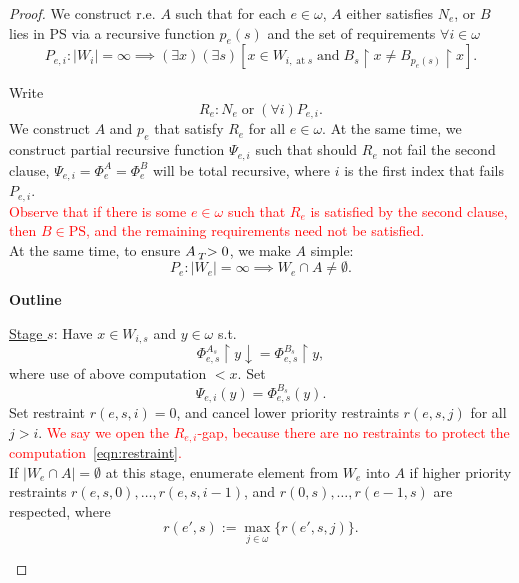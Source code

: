\documentclass{article}
\newcommand{\COMMENT}[1]{\textcolor{red}{#1}}
\begin{document}
  \begin{proof}
    We construct r.e. $A$ such that for each $e\in\omega$, $A$
    either satisfies $N_e$, or $B$ lies in PS via a recursive function
    $p_e(s)$ and the set of requirements $\forall i\in\omega$
    \[P_{e,i}: |W_i|=\infty \implies (\exists x)(\exists s) [x\in
    W_{i,\; \text{at}\; s}\; \text{and}\; B_s\restriction x \neq B_{p_e(s)}
    \restriction x].\]

    Write
    \[R_e: N_e\; \text{or}\; (\forall i)P_{e,i}.\]
    We construct $A$ and $p_e$ that satisfy $R_e$ for all $e\in\omega$. At
    the same time, we construct partial recursive function $\Psi_{e,i}$
    such that should $R_e$ not fail the second clause,
    $\Psi_{e,i}=\Phi_e^A=\Phi_e^B$ will be total recursive, where $i$ is
    the first index that fails $P_{e,i}$.\\

    \COMMENT{Observe that if there is some $e\in\omega$ such that $R_e$ is
    satisfied by the second clause, then $B\in\text{PS}$, and the remaining
    requirements need not be satisfied.}\\

    At the same time, to ensure $A\prescript{}{T}{>}\;0$, we make $A$
    simple:
    \[P_e: |W_e|=\infty \implies W_e\cap A\neq\emptyset.\]

    \textbf{Outline}
    \begin{tcolorbox}
      \underline{Stage $s$}: Have $x\in W_{i,s}$ and $y\in\omega$ s.t.
      \begin{equation}
        \Phi_{e,s}^{A_s}\restriction y \downarrow=
        \Phi_{e,s}^{B_s}\restriction y,
        \label{eqn:restraint}
      \end{equation}
      where use of above computation $<x$. Set
      \begin{equation}
        \Psi_{e,i}(y)=\Phi_{e,s}^{B_s}(y).
        \label{eqn:Psi}
      \end{equation}
      Set restraint $r(e,s,i)=0$, and cancel lower priority restraints
      $r(e,s,j)$ for all $j>i$. \COMMENT{We say we open the $R_{e,i}$-gap,
      because there are no restraints to protect the
      computation~\eqref{eqn:restraint}.}\\

      If $|W_e\cap A|=\emptyset$ at this stage, enumerate element from
      $W_e$ into $A$ if higher priority restraints
      $r(e,s,0),\ldots,r(e,s,i-1)$, and $r(0,s),\ldots,r(e-1,s)$ are
      respected, where
      \[r(e',s):=\max_{j\in\omega}\{r(e',s,j)\}.\]


\end{tcolorbox}
\end{proof}
\end{document}
